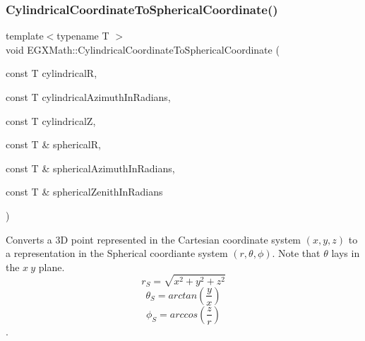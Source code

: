\subsubsection{\texorpdfstring{Cylindrical\+Coordinate\+To\+Spherical\+Coordinate()}{CylindricalCoordinateToSphericalCoordinate()}}
{\footnotesize\ttfamily template$<$typename T $>$ \\
void E\+G\+X\+Math\+::\+Cylindrical\+Coordinate\+To\+Spherical\+Coordinate (\begin{DoxyParamCaption}\item[{const T}]{cylindricalR,  }\item[{const T}]{cylindrical\+Azimuth\+In\+Radians,  }\item[{const T}]{cylindricalZ,  }\item[{const T \&}]{sphericalR,  }\item[{const T \&}]{spherical\+Azimuth\+In\+Radians,  }\item[{const T \&}]{spherical\+Zenith\+In\+Radians }\end{DoxyParamCaption})}



Converts a 3D point represented in the Cartesian coordinate system $(x,y,z)$ to a representation in the Spherical coordiante system $(r,\theta,\phi)$. Note that $\theta$ lays in the $x\ y$ plane. \[ r_S = \sqrt{x^2+y^2+z^2} \] \[ \theta_S = arctan(\frac{y}{x}) \] \[ \phi_S = arccos(\frac{z}{r}) \]. 

